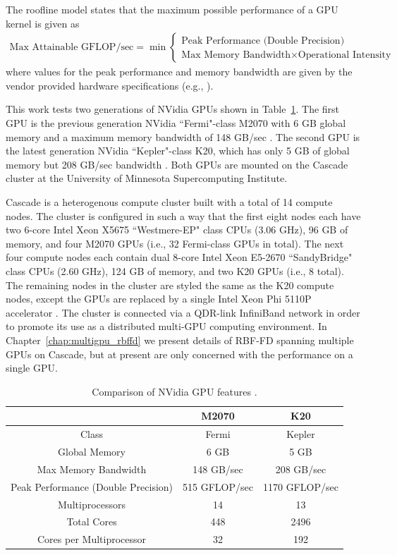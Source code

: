 \documentclass{report}
\begin{document}
The roofline model states that the maximum possible performance of a GPU kernel is given as
\begin{align}
\text{Max Attainable GFLOP/sec} = \min \begin{cases} \text{Peak Performance (Double Precision)} \\ \text{Max Memory Bandwidth} \times \text{Operational Intensity}  \end{cases}
\label{eq:roofline}
\end{align}
where values for the peak performance and memory bandwidth are given by the vendor provided hardware specifications (e.g., \cite{M2070FactSheet, KeplerFactSheet}). 

This work tests two generations of NVidia GPUs shown in Table~\ref{tbl:gpu_comparison}. The first GPU is the previous generation NVidia ``Fermi"-class M2070 with 6 GB global memory and a maximum memory bandwidth of 148 GB/sec \cite{M2070FactSheet}. The second GPU is the latest generation NVidia ``Kepler"-class K20, which has only 5 GB of global memory but 208 GB/sec bandwidth \cite{KeplerFactSheet}. Both GPUs are mounted on the Cascade cluster at the University of Minnesota Supercomputing Institute. 

Cascade is a heterogenous compute cluster built with a total of 14 compute nodes. The cluster is configured in such a way that the first eight nodes each have two 6-core Intel Xeon X5675 ``Westmere-EP" class CPUs (3.06 GHz), 96 GB of memory, and four M2070 GPUs (i.e., 32 Fermi-class GPUs in total). The next four compute nodes each contain dual 8-core Intel Xeon E5-2670 ``SandyBridge" class CPUs (2.60 GHz), 124 GB of memory, and two K20 GPUs (i.e., 8 total). The remaining nodes in the cluster are styled the same as the K20 compute nodes, except the GPUs are replaced by a single Intel Xeon Phi 5110P accelerator \cite{IntelXeonPhi2013}. The cluster is connected via a QDR-link InfiniBand network in order to promote its use as a distributed multi-GPU computing environment. In Chapter~\ref{chap:multigpu_rbffd} we present details of RBF-FD spanning multiple GPUs on Cascade, but at present are only concerned with the performance on a single GPU. 

\begin{table}[t]
\centering
\caption{Comparison of NVidia GPU features \cite{M2070FactSheet,KeplerFactSheet}.}
\label{tbl:gpu_comparison}
\begin{tabular}{c|c|c}
 & M2070  & K20 \\ \hline
Class & Fermi & Kepler \\ \hline
Global Memory & 6 GB & 5 GB \\ 
Max Memory Bandwidth & 148 GB/sec & 208 GB/sec \\ 
Peak Performance (Double Precision) & 515 GFLOP/sec & 1170 GFLOP/sec \\ 
Multiprocessors & 14 & 13 \\ 
Total Cores & 448 & 2496 \\ 
Cores per Multiprocessor & 32 & 192 \\ \hline
\end{tabular}
\end{table}
\end{document}
